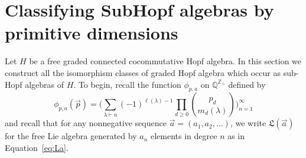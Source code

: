 \documentclass[11pt]{amsart}
\theoremstyle{definition}
\numberwithin{equation}{section}
\def\CC{{\mathbb C}}
\def\ZZ{{\mathbb Z}}
\def\QQ{{\mathbb Q}}
\newcommand{\mike}[1]{\todo[size=\tiny,color=green!30]{#1 \\ \hfill --- Mike}}
\newcommand{\lucas}[1]{\todo[size=\tiny,color=red!50]{#1 \\ \hfill --- Lucas}}
\begin{document}
%



\section{Classifying SubHopf algebras by primitive dimensions}

Let $H$ be a free graded connected cocommutative Hopf algebra.  
In this section we construct all the isomorphism classes of graded Hopf algebra which occur as sub-Hopf algebras of $H$.  
To begin, recall the function $\phi_{p, a}$ on $\QQ^{\ZZ_+}$ defined by
\[
\phi_{p, a}(\vec{p}) = \big( \sum_{\lambda \vdash n} (-1)^{\ell(\lambda) - 1} \prod_{d \ge 0} \binom{p_{d}}{m_{d}(\lambda)} \big)_{n = 1}^{\infty}
\]
and recall that for any nonnegative sequence $\vec{a} = (a_{1}, a_{2}, \ldots)$, we write $\mathfrak{L}(\vec{a})$ for the free Lie algebra generated by $a_{n}$ elements in degree $n$ as in Equation~\eqref{eq:La}.
\end{document}
